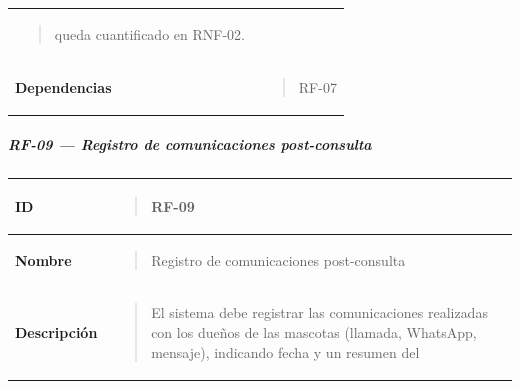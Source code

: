 \documentclass[
]{article}
\newcounter{none} %
\begin{document}
{\begin{longtable}[]{@{}
  >{\raggedright\arraybackslash}p{}
  >{\raggedright\arraybackslash}p{}@{}}
\begin{minipage}[t]{\linewidth}
\begin{quote}
queda cuantificado en RNF-02.
\end{quote}
\end{minipage} \\
\textbf{Dependencias} & \begin{minipage}[t]{\linewidth}\raggedright
\begin{quote}
RF-07
\end{quote}
\end{minipage} \\
\end{longtable}
}

\subparagraph{RF-09 --- Registro de comunicaciones
post-consulta}\label{rf-09-registro-de-comunicaciones-post-consulta}

{\def\LTcaptype{none} %
\begin{longtable}[]{@{}
  >{\raggedright\arraybackslash}p{}
  >{\raggedright\arraybackslash}p{}@{}}
\toprule\noalign{}
\begin{minipage}[b]{\linewidth}\raggedright
\textbf{ID}
\end{minipage} & \begin{minipage}[b]{\linewidth}\raggedright
\begin{quote}
RF-09
\end{quote}
\end{minipage} \\
\midrule\noalign{}
\endhead
\bottomrule\noalign{}
\endlastfoot
\textbf{Nombre} & \begin{minipage}[t]{\linewidth}\raggedright
\begin{quote}
Registro de comunicaciones post-consulta
\end{quote}
\end{minipage} \\
\textbf{Descripción} & \begin{minipage}[t]{\linewidth}\raggedright
\begin{quote}
El sistema debe registrar las comunicaciones realizadas con los dueños
de las mascotas (llamada, WhatsApp, mensaje), indicando fecha y un
resumen del


\end{quote}
\end{minipage}
\end{longtable}}
\end{document}
